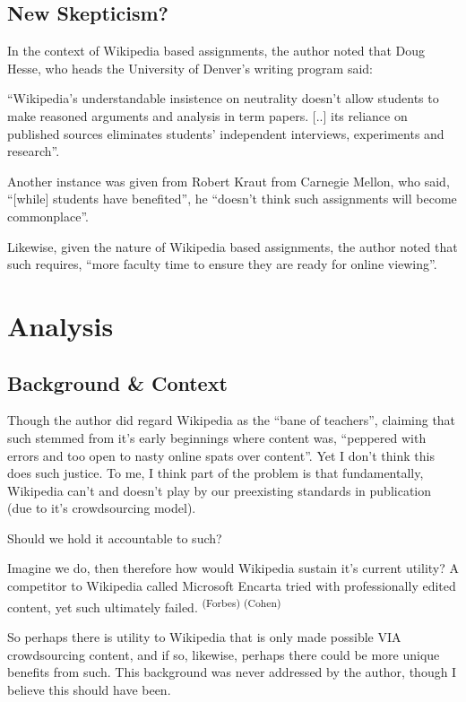 \subsection{New Skepticism?}

In the context of Wikipedia based assignments, the author noted that Doug Hesse, who heads the University of Denver’s writing program said:

``Wikipedia’s understandable insistence on neutrality doesn’t allow students to make reasoned arguments and analysis in term papers. [..] its reliance on published sources eliminates students’ independent interviews, experiments and research''.

Another instance was given from Robert Kraut from Carnegie Mellon, who said, ``[while] students have benefited'', he ``doesn’t think such assignments will become commonplace''.

Likewise, given the nature of Wikipedia based assignments, the author noted that such requires, ``more faculty time to ensure they are ready for online viewing''.


\section{Analysis}


\subsection{Background \& Context}

Though the author did regard Wikipedia as the ``bane of teachers'', claiming that such stemmed from it's early beginnings where content was, ``peppered with errors and too open to nasty online spats over content''. Yet I don't think this does such justice. To me, I think part of the problem is that fundamentally, Wikipedia can’t and doesn’t play by our preexisting standards in publication (due to it's crowdsourcing model).

Should we hold it accountable to such?

Imagine we do, then therefore how would Wikipedia sustain it's current utility?
A competitor to Wikipedia called Microsoft Encarta tried with professionally edited content, yet such ultimately failed. \textsuperscript{(Forbes) (Cohen)}

So perhaps there is utility to Wikipedia that is only made possible VIA crowdsourcing content, and if so, likewise, perhaps there could be more unique benefits from such. This background was never addressed by the author, though I believe this should have been. 


